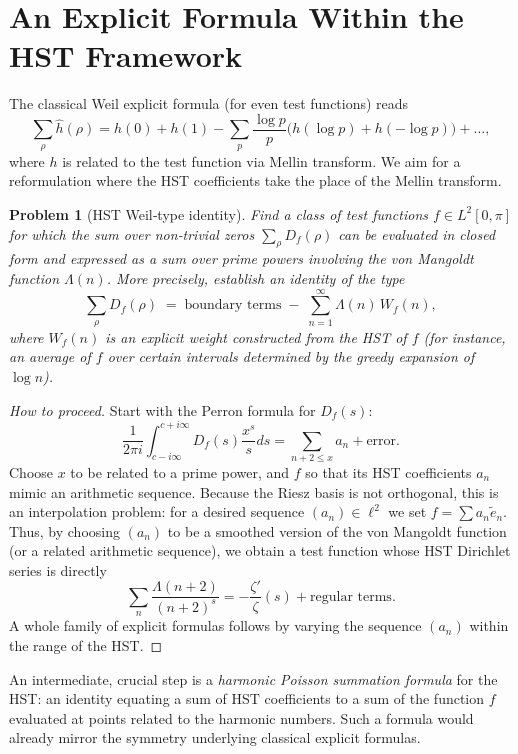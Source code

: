 \documentclass[11pt,a4paper]{article}
\newtheorem{problem}{Problem}[section]
\begin{document}
\section{An Explicit Formula Within the HST Framework}

The classical Weil explicit formula (for even test functions) reads
\[
\sum_{\rho} \widehat{h}(\rho) = h(0) + h(1) - \sum_{p}\frac{\log p}{p} \big( h(\log p) + h(-\log p) \big) + \ldots,
\]
where \(h\) is related to the test function via Mellin transform. We aim for a reformulation where the HST coefficients take the place of the Mellin transform.

\begin{problem}[HST Weil‑type identity]
\label{prob:weil}
Find a class of test functions \(f\in L^2[0,\pi]\) for which the sum over non‑trivial zeros \(\sum_{\rho} D_f(\rho)\) can be evaluated in closed form and expressed as a sum over prime powers involving the von Mangoldt function \(\Lambda(n)\). More precisely, establish an identity of the type
\[
\sum_{\rho} D_f(\rho) \;=\; \text{boundary terms} \;-\; \sum_{n=1}^\infty \Lambda(n)\, W_f(n),
\]
where \(W_f(n)\) is an explicit weight constructed from the HST of \(f\) (for instance, an average of \(f\) over certain intervals determined by the greedy expansion of \(\log n\)).
\end{problem}

\begin{proof}[How to proceed]
Start with the Perron formula for \(D_f(s)\):
\[
\frac{1}{2\pi i} \int_{c-i\infty}^{c+i\infty} D_f(s) \frac{x^s}{s} ds = \sum_{n+2 \le x} a_n + \text{error}.
\]
Choose \(x\) to be related to a prime power, and \(f\) so that its HST coefficients \(a_n\) mimic an arithmetic sequence. Because the Riesz basis is not orthogonal, this is an interpolation problem: for a desired sequence \((a_n)\in\ell^2\) we set \(f = \sum a_n \tilde{e}_n\). Thus, by choosing \((a_n)\) to be a smoothed version of the von Mangoldt function (or a related arithmetic sequence), we obtain a test function whose HST Dirichlet series is directly
\[
\sum_{n} \frac{\Lambda(n+2)}{(n+2)^s} = -\frac{\zeta'}{\zeta}(s) + \text{regular terms}.
\]
A whole family of explicit formulas follows by varying the sequence \((a_n)\) within the range of the HST.
\end{proof}

An intermediate, crucial step is a \emph{harmonic Poisson summation formula} for the HST: an identity equating a sum of HST coefficients to a sum of the function \(f\) evaluated at points related to the harmonic numbers. Such a formula would already mirror the symmetry underlying classical explicit formulas.
\end{document}
